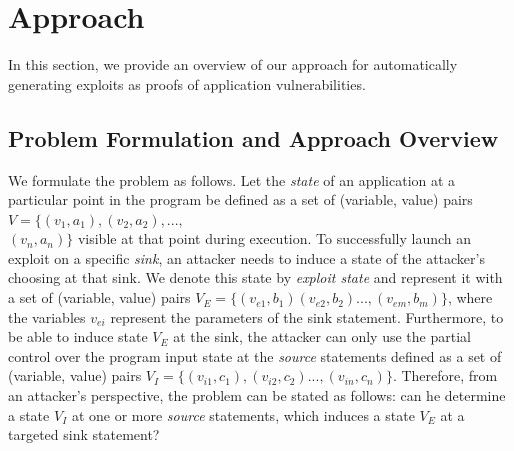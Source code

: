 \section{Approach}
\label{sec:approach}


In this section, we provide an overview of our approach for automatically generating exploits as proofs of application vulnerabilities.

\subsection{Problem Formulation and Approach Overview} We formulate the problem as follows. Let the \textit{state} of an application at a particular point in the program be defined as a set of (variable, value) pairs $V = \{(v_1, a_1), (v_2, a_2), ...,$ \\
$ (v_n, a_n)\}$ visible at that point during execution. 
To successfully launch an exploit on a specific \textit{sink}, an attacker needs to induce a state of the attacker's choosing at that sink. We denote this state by \textit{exploit state} and represent it with a set of (variable, value) pairs $V_E = \{(v_{e1}, b_1) (v_{e2}, b_2) ..., (v_{em}, b_m)\}$, where the variables $v_{ei}$ represent the parameters of the sink statement. Furthermore, to be able to induce state $V_E$ at the sink, the attacker can only use the partial control over the program input state at the \textit{source} statements defined as a set of (variable, value) pairs $V_I = \{(v_{i1}, c_1), (v_{i2}, c_2) ..., (v_{in}, c_n)\}$. Therefore, from an attacker's perspective, the problem can be stated as follows: can he determine a state $V_I$ at one or more \textit{source} statements, which induces a state $V_E$ at a targeted sink statement?

